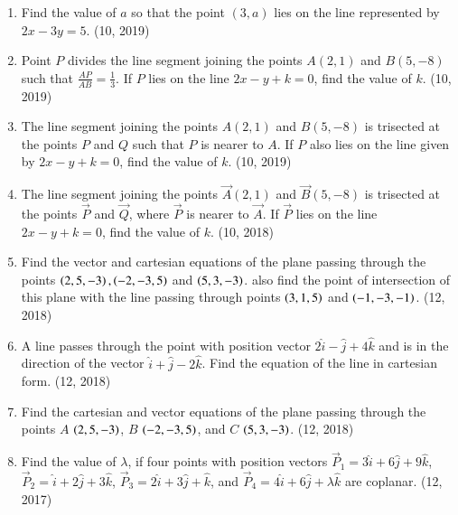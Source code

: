 \begin{enumerate}[label=\thesubsection.\arabic*, ref=\thesubsection.\theenumi]
\item Find the value of $a$ so that the point $(3, a)$ lies on the line represented by $2x - 3y = 5$. \hfill (10, 2019)
\item Point $P$ divides the line segment joining the points $A(2, 1)$ and $B(5, -8)$ such that $\frac{AP}{AB} = \frac{1}{3}$. If $P$ lies on the line $2x - y + k = 0$, find the value of $k$. \hfill (10, 2019)
\item The line segment joining the points $A(2, 1)$ and $B(5, -8)$ is trisected at the points $P$ and $Q$ such that $P$ is nearer to $A$. If $P$ also lies on the line given by $2x - y + k = 0$, find the value of $k$. \hfill (10, 2019)
    \item The line segment joining the points $\vec{A}(2,1)$ and $\vec{B}(5,-8)$ is trisected at the points $\vec{P}$ and $\vec{Q}$, where $\vec{P}$ is nearer to $\vec{A}$. If $\vec{P}$ lies on the line $2x - y + k = 0$, find the value of $k$. \hfill (10, 2018)
\item Find the vector and cartesian equations of the plane passing through the points $\left(2,5,-3\right),\left(-2,-3,5\right)$ and $\left(5,3,-3\right)$. also find the point of intersection of this plane with the line passing through points $\left(3,1,5\right)$ and $\left(-1,-3,-1\right)$.
\hfill (12, 2018)
\item A line passes through the point with position vector $2\hat{i}-\hat{j}+4\hat{k}$ and is in the direction of the vector $\hat{i}+\hat{j}-2\hat{k}$. Find the equation of the line in cartesian form.
\hfill (12, 2018) 
\item Find the cartesian and vector equations of the plane passing through the points $A$ $\left(2, 5, -3\right)$, $B$ $\left(-2, -3, 5\right)$, and $C$ $\left(5, 3, -3\right)$.
\hfill (12, 2018) 
    \item Find the value of $\lambda$, if four points with position vectors $\vec{P}_1 = 3\hat{i} + 6\hat{j} + 9\hat{k}$, $\vec{P}_2 = \hat{i} + 2\hat{j} + 3\hat{k}$, $\vec{P}_3 = 2\hat{i} + 3\hat{j} + \hat{k}$, and $\vec{P}_4 = 4\hat{i} + 6\hat{j} + \lambda\hat{k}$ are coplanar. \hfill (12, 2017)
\end{enumerate}
